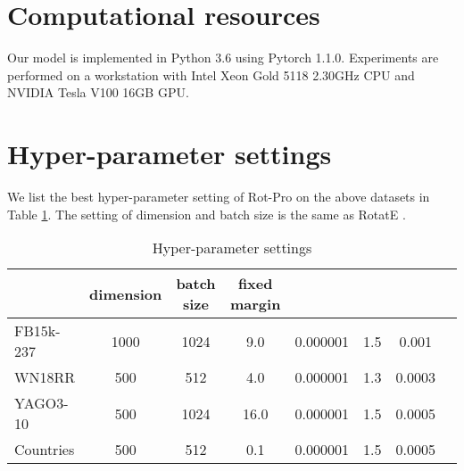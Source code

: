 \documentclass{article}
\begin{document}
\section{Computational resources}
Our model is implemented in Python 3.6 using Pytorch 1.1.0. Experiments are performed on a workstation with Intel Xeon Gold 5118 2.30GHz CPU and NVIDIA Tesla V100 16GB GPU.

\section{Hyper-parameter settings}
We list the best hyper-parameter setting of Rot-Pro on the above datasets in Table \ref{tab:append:hyper-param}. The setting of dimension  and batch size  is the same as RotatE \cite{rotate}.
\begin{table}[H]
    \centering
    \caption{Hyper-parameter settings}
    \label{tab:append:hyper-param}
    \begin{tabular}{lccccccc}
    \toprule
         &  dimension  & batch size  & fixed margin  &  &  & \\
    \midrule
        FB15k-237 & 1000 & 1024 & 9.0 & 0.000001 & 1.5 & 0.001\\
        WN18RR & 500 & 512 & 4.0 & 0.000001 & 1.3 & 0.0003\\
        YAGO3-10 & 500 & 1024 & 16.0 & 0.000001 & 1.5 & 0.0005 \\
        Countries & 500 & 512 & 0.1 & 0.000001 & 1.5&0.0005\\
    \bottomrule
    \end{tabular}
\end{table}
\end{document}

